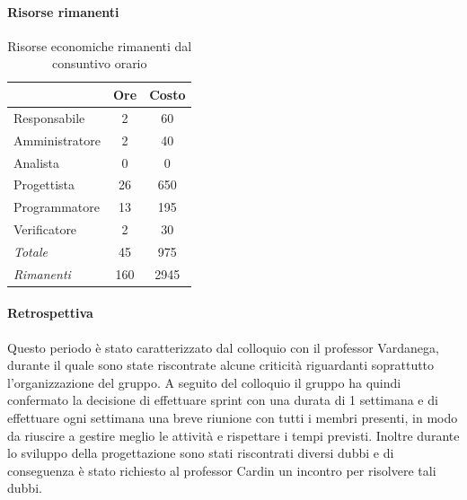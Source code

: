 \documentclass[a4paper,12pt]{article}
\begin{document}
            \paragraph{Risorse rimanenti}
                \begin{table}[H]
                \centering
                \caption{Risorse economiche rimanenti dal consuntivo orario}
                \begin{tabular}{|l|c|c|}
                \hline
                    \rowcolor{lightgray}{\textbf{Ruolo}} & {\textbf{Ore}} & {\textbf{Costo}}\\
                \hline
                    Responsabile & 2 & 60\\
                \hline
                    Amministratore & 2 & 40\\
                \hline
                    Analista & 0 & 0\\
                \hline
                    Progettista & 26 & 650\\
                \hline
                    Programmatore & 13 & 195\\
                \hline
                    Verificatore & 2 & 30\\
                \hline
                    \rowcolor{lightgray}\textit{Totale} & 45 & 975\\
                \hline
                    \rowcolor{lightgray}\textit{Rimanenti} & 160 & 2945\\
                \hline
                \end{tabular}
                \end{table}
                
            \paragraph{Retrospettiva}
            Questo periodo è stato caratterizzato dal colloquio con il professor Vardanega, durante il quale sono state riscontrate alcune criticità riguardanti soprattutto l'organizzazione del gruppo.
            A seguito del colloquio il gruppo ha quindi confermato la decisione di effettuare sprint con una durata di 1 settimana e di effettuare ogni settimana una breve riunione con tutti i membri presenti, in modo da riuscire a gestire meglio le attività e rispettare i tempi previsti.
            Inoltre durante lo sviluppo della progettazione sono stati riscontrati diversi dubbi e di conseguenza è stato richiesto al professor Cardin un incontro per risolvere tali dubbi.
\end{document}
